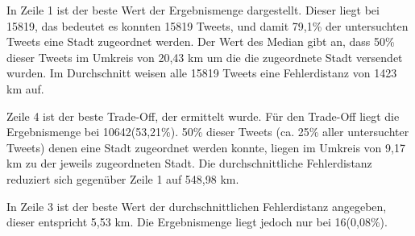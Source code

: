				In Zeile 1 ist der beste Wert der Ergebnismenge dargestellt.
				Dieser liegt bei 15819, das bedeutet es konnten 15819 Tweets, und damit 79,1\% der untersuchten Tweets eine Stadt zugeordnet werden.
				Der Wert des Median gibt an, dass 50\% dieser Tweets im Umkreis von 20,43 km um die die zugeordnete Stadt versendet wurden.
				Im Durchschnitt weisen alle 15819 Tweets eine Fehlerdistanz von 1423 km auf.

				Zeile 4 ist der beste Trade-Off, der ermittelt wurde.
				Für den Trade-Off liegt die Ergebnismenge bei 10642(53,21\%).
				50\% dieser Tweets (ca. 25\% aller untersuchter Tweets) denen eine Stadt zugeordnet werden konnte, liegen im Umkreis von 9,17 km zu der jeweils zugeordneten Stadt.
				Die durchschnittliche Fehlerdistanz reduziert sich gegenüber Zeile 1 auf 548,98 km. 

				In Zeile 3 ist der beste Wert der durchschnittlichen Fehlerdistanz angegeben, dieser entspricht 5,53 km.
				Die Ergebnismenge liegt jedoch nur bei 16(0,08\%).

